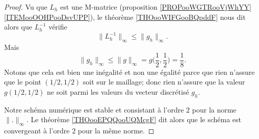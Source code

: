 \begin{proof}
    Vu que \( L_h\) est une M-matrice (proposition \ref{PROPooWGTRooVjWhYY}\ref{ITEMooOOHPooDsvUPP}), le théorème \ref{THOooWIFGooBQpddF} nous dit alors que \( L_h^{-1}\) vérifie
    \begin{equation}
        \| L_h^{-1} \|_{\infty}\leq \| g_h \|_{\infty}.
    \end{equation}
    Mais 
    \begin{equation}
        \| g_h \|_{\infty}\leq \| g \|_{\infty}=g\big( \frac{ 1 }{2},\frac{ 1 }{2} \big)=\frac{1}{ 8 }.
    \end{equation}
    Notons que cela est bien une inégalité et non une égalité parce que rien n'assure que le point \( (1/2,1/2)\) soit sur le maillage; donc rien n'assure que la valeur \( g(1/2,1/2)\) ne soit parmi les valeurs du vecteur discrétisé \( g_h\).

    Notre schéma numérique est stable et consistant à l'ordre \( 2\) pour la norme \( \| . \|_{\infty}\). Le théorème \ref{THOooEPQQooUQMcgF} dit alors que le schéma est convergeant à l'ordre \( 2\) pour la même norme.
\end{proof}
